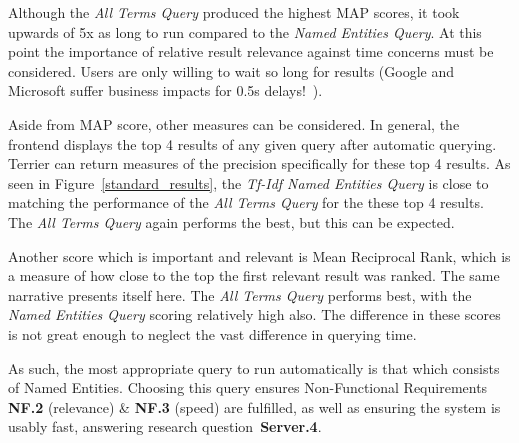 \documentclass{l4proj}
\begin{document}
Although the \textit{All Terms Query} produced the highest MAP scores, it took upwards of 5x as long to run compared to the \textit{Named Entities Query}. At this point the importance of relative result relevance against time concerns must be considered. Users are only willing to wait so long for results (Google and Microsoft suffer business impacts for 0.5s delays!~\cite{performance}).

Aside from MAP score, other measures can be considered. In general, the frontend displays the top 4 results of any given query after automatic querying. Terrier can return measures of the precision specifically for these top 4 results. As seen in Figure~\ref{standard_results}, the \textit{Tf-Idf Named Entities Query} is close to matching the performance of the \textit{All Terms Query} for the these top 4 results. The \textit{All Terms Query} again performs the best, but this can be expected.

Another score which is important and relevant is Mean Reciprocal Rank, which is a measure of how close to the top the first relevant result was ranked. The same narrative presents itself here. The \textit{All Terms Query} performs best, with the \textit{Named Entities Query} scoring relatively high also. The difference in these scores is not great enough to neglect the vast difference in querying time.

As such, the most appropriate query to run automatically is that which consists of Named Entities. Choosing this query ensures Non-Functional Requirements \textbf{NF.2} (relevance) \& \textbf{NF.3} (speed) are fulfilled, as well as ensuring the system is usably fast, answering research question~\textbf{Server.4}.
\end{document}
